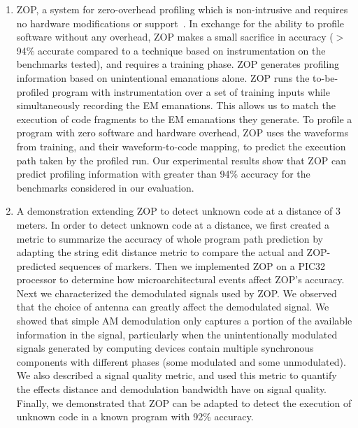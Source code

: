 \begin{enumerate}
\item ZOP, a system for zero-overhead profiling which is non-intrusive and requires no hardware modifications or support~\cite{zop}. In exchange for the ability to profile software without any overhead, ZOP makes a small sacrifice in accuracy ($>$ 94\% accurate compared to a technique based on instrumentation on the benchmarks tested), and requires a training phase. ZOP generates profiling information based on unintentional emanations alone. ZOP runs the to-be-profiled program with instrumentation over a set of training inputs while simultaneously recording the EM emanations. This allows us to match the execution of code fragments to the EM emanations they generate. To profile a program with zero software and hardware overhead, ZOP uses the waveforms from training, and their waveform-to-code mapping, to predict the execution path taken by the profiled run. Our experimental results show that ZOP can predict profiling information with greater than 94\% accuracy for the benchmarks considered in our evaluation.
\item A demonstration extending ZOP to detect unknown code at a distance of 3 meters. In order to detect unknown code at a distance, we first created a metric to summarize the accuracy of whole program path prediction by adapting the string edit distance metric to compare the actual and ZOP-predicted sequences of markers. Then we implemented ZOP on a PIC32 processor to determine how microarchitectural events affect ZOP's accuracy. Next we characterized the demodulated signals used by ZOP. We observed that the choice of antenna can greatly affect the demodulated signal. We showed that simple AM demodulation only captures a portion of the available information in the signal, particularly when the unintentionally modulated signals generated by computing devices contain multiple synchronous components with different phases (some modulated and some unmodulated). We also described a signal quality metric, and used this metric to quantify the effects distance and demodulation bandwidth have on signal quality. Finally, we demonstrated that ZOP can be adapted to detect the execution of unknown code in a known program with 92\% accuracy.
\end{enumerate}

